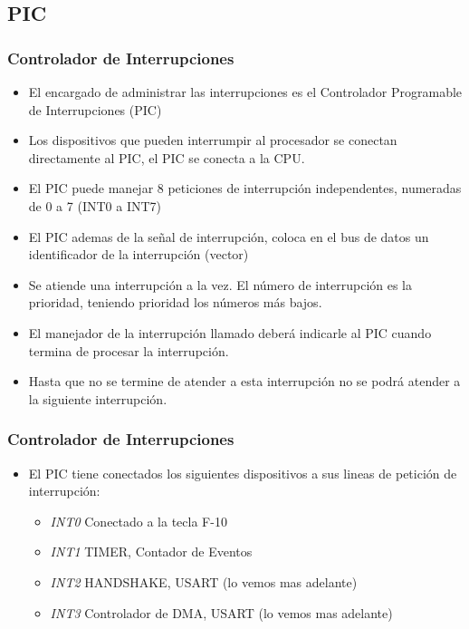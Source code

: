 \documentclass{beamer}
\begin{document}
\subsection{PIC}
\begin{frame}
\frametitle{Controlador de Interrupciones}

\begin{itemize}
 \item El encargado de administrar las interrupciones es el Controlador Programable de Interrupciones (PIC)
 \item Los dispositivos que pueden interrumpir al procesador se conectan directamente al PIC, el PIC se conecta a la CPU.
 \item El PIC puede manejar 8 peticiones de interrupción independentes, numeradas de 0 a 7 (INT0 a INT7)
 \item El PIC ademas de la señal de interrupción, coloca en el bus de datos un identificador de la interrupción (vector)
 \item Se atiende una interrupción a la vez. El número de interrupción es la prioridad, teniendo prioridad los números más bajos.
 \item El manejador de la interrupción llamado deberá indicarle al PIC cuando termina de procesar la interrupción. 
 \item Hasta que no se termine de atender a esta interrupción no se podrá atender a la siguiente interrupción.
\end{itemize}
\end{frame}

\begin{frame}
\frametitle{Controlador de Interrupciones}

\begin{itemize}
 \item El PIC tiene conectados los siguientes dispositivos a sus lineas de petición de interrupción:
 \begin{itemize}
  \item \emph{INT0} Conectado a la tecla F-10
  \item \emph{INT1} TIMER, Contador de Eventos
  \item \emph{INT2} HANDSHAKE, USART (lo vemos mas adelante)
  \item \emph{INT3} Controlador de DMA, USART (lo vemos mas adelante)
 \end{itemize}
\end{itemize}

\end{frame}
\end{document}
